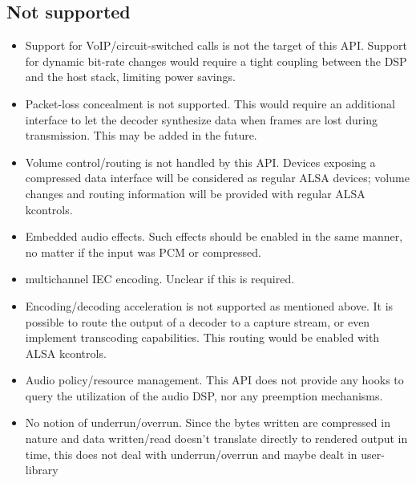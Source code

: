 \documentclass[a4paper,8pt,english]{sphinxmanual}
\begin{document}
\subsection{Not supported}
\label{sound/designs/compress-offload:not-supported}\begin{itemize}
\item {} 
Support for VoIP/circuit-switched calls is not the target of this
API. Support for dynamic bit-rate changes would require a tight
coupling between the DSP and the host stack, limiting power savings.

\item {} 
Packet-loss concealment is not supported. This would require an
additional interface to let the decoder synthesize data when frames
are lost during transmission. This may be added in the future.

\item {} 
Volume control/routing is not handled by this API. Devices exposing a
compressed data interface will be considered as regular ALSA devices;
volume changes and routing information will be provided with regular
ALSA kcontrols.

\item {} 
Embedded audio effects. Such effects should be enabled in the same
manner, no matter if the input was PCM or compressed.

\item {} 
multichannel IEC encoding. Unclear if this is required.

\item {} 
Encoding/decoding acceleration is not supported as mentioned
above. It is possible to route the output of a decoder to a capture
stream, or even implement transcoding capabilities. This routing
would be enabled with ALSA kcontrols.

\item {} 
Audio policy/resource management. This API does not provide any
hooks to query the utilization of the audio DSP, nor any preemption
mechanisms.

\item {} 
No notion of underrun/overrun. Since the bytes written are compressed
in nature and data written/read doesn't translate directly to
rendered output in time, this does not deal with underrun/overrun and
maybe dealt in user-library

\end{itemize}
\end{document}
